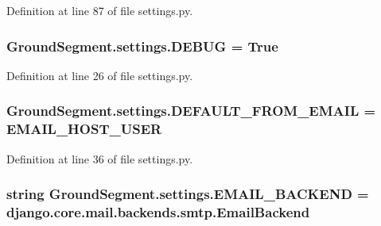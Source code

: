 Definition at line 87 of file settings.\+py.

\hypertarget{namespace_ground_segment_1_1settings_a7398b478a987ae21647fbb08b265ad10}{}
\subsubsection[{D\+E\+B\+U\+G}]{\setlength{\rightskip}{0pt plus 5cm}Ground\+Segment.\+settings.\+D\+E\+B\+U\+G = True}\label{namespace_ground_segment_1_1settings_a7398b478a987ae21647fbb08b265ad10}


Definition at line 26 of file settings.\+py.

\hypertarget{namespace_ground_segment_1_1settings_ac016a8ca7717627c7aa8538920482b88}{}
\subsubsection[{D\+E\+F\+A\+U\+L\+T\+\_\+\+F\+R\+O\+M\+\_\+\+E\+M\+A\+I\+L}]{\setlength{\rightskip}{0pt plus 5cm}Ground\+Segment.\+settings.\+D\+E\+F\+A\+U\+L\+T\+\_\+\+F\+R\+O\+M\+\_\+\+E\+M\+A\+I\+L = {\bf E\+M\+A\+I\+L\+\_\+\+H\+O\+S\+T\+\_\+\+U\+S\+E\+R}}\label{namespace_ground_segment_1_1settings_ac016a8ca7717627c7aa8538920482b88}


Definition at line 36 of file settings.\+py.

\hypertarget{namespace_ground_segment_1_1settings_ada1dcaeb590c4106b8bd01b0bf16d8c7}{}
\subsubsection[{E\+M\+A\+I\+L\+\_\+\+B\+A\+C\+K\+E\+N\+D}]{\setlength{\rightskip}{0pt plus 5cm}string Ground\+Segment.\+settings.\+E\+M\+A\+I\+L\+\_\+\+B\+A\+C\+K\+E\+N\+D = \textquotesingle{}django.\+core.\+mail.\+backends.\+smtp.\+Email\+Backend\textquotesingle{}}\label{namespace_ground_segment_1_1settings_ada1dcaeb590c4106b8bd01b0bf16d8c7}


